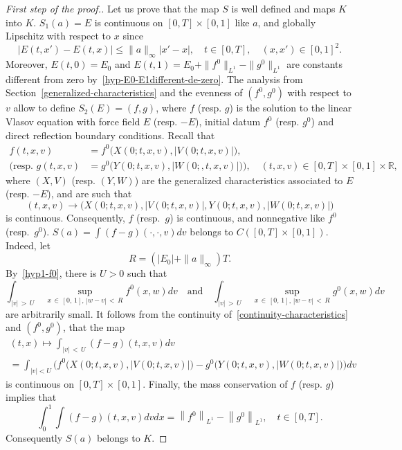 \documentclass[10pt]{amsart}
\theoremstyle{definition}\newtheorem{defi}[theo]{Definition}\newtheorem{rema}[theo]{Remark}\newtheorem{exam}[theo]{Example}\newtheorem{exem}[theo]{Example}\newtheorem{nota}[theo]{Notation}
\newcommand{\R}{\mathbb{R}}
\begin{document}
\begin{proof}[{First step of the proof.}]
Let us prove that the map $S$ is well defined and maps $K$ into $K$. $S_1(a) = E$ is continuous on $[0,T] \times [0,1]$ like $a$, and globally Lipschitz with respect to $x$ since
\begin{equation}
\left| E\left(t,x'\right) - E(t,x) \right| \leq \| a \|_\infty |x' - x|, \quad t \in [0,T],\quad (x,x') \in [0,1]^2.\label{E_lip}
\end{equation}
Moreover, $E(t,0)= E_0$ and $E(t,1)= E_0+ \| f^0 \|_{L^1} - \| g^0 \|_{L^1}$ are constants different from zero by~\eqref{hyp-E0-E1different-de-zero}. The analysis from Section~\ref{generalized-characteristics} and the evenness of $(f^0,g^0) $ with respect to $v$ allow to define $S_2(E)= (f,g)$, where $f$ (resp. $g$) is the solution to the linear Vlasov equation with force field $E$ (resp. $-E$), initial datum $f^0$ (resp. $g^0$) and direct reflection boundary conditions. Recall that
\begin{align*}
f(t,x,v)&= f^0\big(X(0;t,x,v),|V(0;t,x,v)|\big),\\
\big(\text{resp. } g(t,x,v)&= g^0\big(Y(0;t,x,v),|W(0;,t,x,v)|\big)\big),\quad (t,x,v)\in [0,T] \times [0,1] \times \R,
\end{align*}
where $(X,V)$ (resp. $(Y,W)$) are the generalized characteristics associated to $E$ (resp. $-E$), and are such that
\begin{equation}\label{continuity-characteristics}
(t,x,v)\rightarrow \big(X(0;t,x,v),\lvert V(0;t,x,v)\rvert,Y(0;t,x,v),\lvert W(0;t,x,v)\rvert\big)
\end{equation}
is continuous. Consequently, $f$ (resp.~$g$) is continuous, and nonnegative like $f^0$ (resp.~$g^0$). 
$S(a)=\int (f-g)(\cdot,\cdot,v)dv$ belongs to $C([0,T] \times [0,1])$. Indeed, let
\[
R= \left(\left|E_0\right| + \|a \|_\infty \right) T.
\]
By~\eqref{hyp1-f0}, there is $U>0$ such that
\[
\int_{|v|\,>\,U}\;\sup_{x\,\in\,[0,\,1],\,|w-v|\,<\,R} f^0(x,w)dv \quad \text{and} \quad \int_{|v|\,>\,U}\; \sup_{x\,\in\,[0,\,1],\,|w-v|\,<\,R} g^0(x,w)dv
\]
are arbitrarily small. It follows from the continuity of~\eqref{continuity-characteristics} and $(f^0,g^0)$, that the map
\begin{multline*}
(t,x) \mapsto \int _{|v|\,<\,U}(f-g)(t,x,v)dv\\
= \int_{|v|<U} \Big(f^0\big(X(0;t,x,v),\lvert V(0;t,x,v)\rvert\big)-g^0\big(Y(0;t,x,v),\lvert W(0;t,x,v)\rvert\big) \Big) dv
\end{multline*}
is continuous on $[0,T] \times [0,1]$. Finally, the mass conservation of $f$ (resp. $g$) implies that
\[
\int_0^1 \int (f-g)(t,x,v)dvdx= \left\|f^0\right\|_{L^1} - \left\|g^0\right\|_{L^1}, \quad t \in [0,T].
\]
Consequently $S(a)$ belongs to $K$.
\end{proof}
\end{document}
